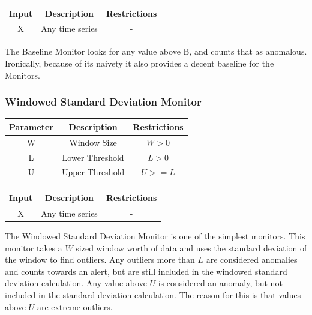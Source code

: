 \documentclass[12pt]{ucthesis}
\begin{document}
\begin{table}[H]
   \begin{center}
      \begin{tabular}{|c|c|c|}
         \hline
            Input & Description & Restrictions \\
         \hline
            X & Any time series & - \\
         \hline
      \end{tabular}
   \end{center}
\end{table}

The Baseline Monitor looks for any value above B, and counts that as anomalous.
Ironically, because of its naivety it also provides a decent baseline for the Monitors.

\subsubsection{Windowed Standard Deviation Monitor}
\label{outage-detection-monitors-WindowStdDev}
\begin{table}[H]
   \begin{center}
      \begin{tabular}{|c|c|c|}
         \hline
            Parameter & Description & Restrictions \\
         \hline
            W & Window Size & $ W > 0 $\\
         \hline
            L & Lower Threshold & $L > 0 $\\
         \hline
            U & Upper Threshold & $U >= L $\\
         \hline
      \end{tabular}
   \end{center}
\end{table}

\begin{table}[H]
   \begin{center}
      \begin{tabular}{|c|c|c|}
         \hline
            Input & Description & Restrictions \\
         \hline
            X & Any time series & - \\
         \hline
      \end{tabular}
   \end{center}
\end{table}

The Windowed Standard Deviation Monitor is one of the simplest monitors. This monitor takes a $W$ sized window worth of data
and uses the standard deviation of the window to find outliers. Any outliers more than $L$ are considered anomalies and counts towards
an alert, but are still included in the windowed standard deviation calculation. Any value above $U$ is considered an anomaly, but not included
in the standard deviation calculation. The reason for this is that values above $U$ are extreme outliers.
\end{document}
